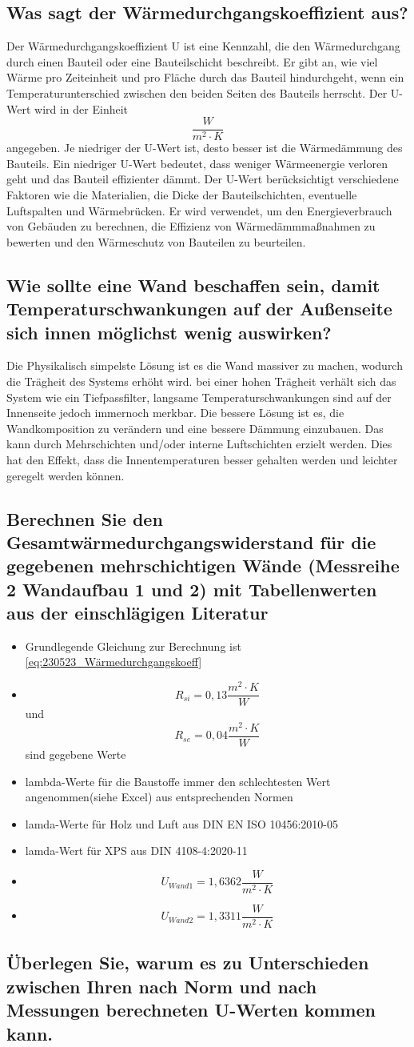 \subsection{Was sagt der Wärmedurchgangskoeffizient aus?}
Der Wärmedurchgangskoeffizient U ist eine Kennzahl, die den Wärmedurchgang durch einen Bauteil oder eine Bauteilschicht beschreibt. 
Er gibt an, wie viel Wärme pro Zeiteinheit und pro Fläche durch das Bauteil hindurchgeht, wenn ein Temperaturunterschied zwischen den beiden Seiten des Bauteils herrscht.
Der U-Wert wird in der Einheit $$\frac{W}{m^2 \cdot K}$$ angegeben. Je niedriger der U-Wert ist, desto besser ist die Wärmedämmung des Bauteils. 
Ein niedriger U-Wert bedeutet, dass weniger Wärmeenergie verloren geht und das Bauteil effizienter dämmt.
Der U-Wert berücksichtigt verschiedene Faktoren wie die Materialien, die Dicke der Bauteilschichten, eventuelle Luftspalten und Wärmebrücken. 
Er wird verwendet, um den Energieverbrauch von Gebäuden zu berechnen, die Effizienz von Wärmedämmmaßnahmen zu bewerten und den Wärmeschutz von Bauteilen zu beurteilen.
\subsection{Wie sollte eine Wand beschaffen sein, damit Temperaturschwankungen auf der Außenseite sich innen möglichst wenig auswirken?}
Die Physikalisch simpelste Lösung ist es die Wand massiver zu machen, wodurch die Trägheit des Systems erhöht wird.
bei einer hohen Trägheit verhält sich das System wie ein Tiefpassfilter, langsame Temperaturschwankungen sind auf der Innenseite jedoch immernoch merkbar.
Die bessere Lösung ist es, die Wandkomposition zu verändern und eine bessere Dämmung einzubauen.
Das kann durch Mehrschichten und/oder interne Luftschichten erzielt werden.
Dies hat den Effekt, dass die Innentemperaturen besser gehalten werden und leichter geregelt werden können.

\subsection{Berechnen Sie den Gesamtwärmedurchgangswiderstand für die gegebenen mehrschichtigen Wände (Messreihe 2 Wandaufbau 1 und 2) mit Tabellenwerten aus der einschlägigen Literatur}
\begin{itemize}
\item Grundlegende Gleichung zur Berechnung ist \autoref*{eq:230523_Wärmedurchgangskoeff}
\item $$R_{si}=0,13\frac{m^2 \cdot K}{W}$$ und $$R_{se}=0,04\frac{m^2 \cdot K}{W}$$ sind gegebene Werte
\item lambda-Werte für die Baustoffe immer den schlechtesten Wert angenommen(siehe Excel) aus entsprechenden Normen
\item lamda-Werte für Holz \cite[S.20]{lamda-holz-luft} und Luft\cite[S. 15]{lamda-holz-luft} aus DIN EN ISO 10456:2010-05
\item lamda-Wert für XPS \cite[S.23]{lamda-xps} aus DIN 4108-4:2020-11
\item $$U_{Wand 1}=1,6362 \frac{W}{m^2 \cdot K}$$
\item $$U_{Wand 2}=1,3311 \frac{W}{m^2 \cdot K}$$
\end{itemize}


\subsection{Überlegen Sie, warum es zu Unterschieden zwischen Ihren nach Norm und nach Messungen berechneten U-Werten kommen kann.}
